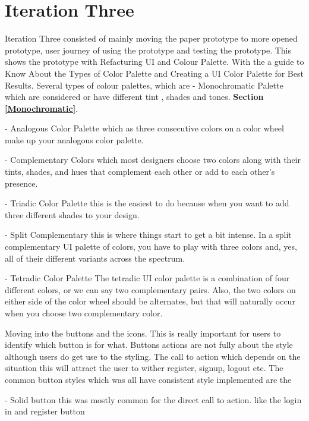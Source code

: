 \documentclass{l4proj}
\begin{document}
\section{Iteration Three}\label{requirementsIterationThree}


Iteration Three consisted of mainly moving the paper prototype to more opened prototype, user journey of using the prototype and testing the prototype. 
This shows the prototype with Refacturing UI and Colour Palette. With the a guide to Know About the Types of Color Palette and Creating a UI Color Palette for Best Results. Several types of colour palettes, which are 
- Monochromatic Palette which are considered or have different tint , shades and tones. \textbf{Section \ref{Monochromatic}}.



- Analogous Color Palette which as three consecutive colors on a color wheel make up your analogous color palette. 


- Complementary Colors which most designers choose two colors along with their tints, shades, and hues that complement each other or add to each other's presence.



- Triadic Color Palette this is the easiest to do because when you want to add three different shades to your design.


- Split Complementary this is where things start to get a bit intense. In a split complementary UI palette of colors, you have to play with three colors and, yes, all of their different variants across the spectrum.



- Tetradic Color Palette The tetradic UI color palette is a combination of four different colors, or we can say two complementary pairs. Also, the two colors on either side of the color wheel should be alternates, but that will naturally occur when you choose two complementary color. 


Moving into the buttons and the icons. This is really important for users to identify which button is for what. Buttons actions are not fully about the style although users do get use to the styling. The call to action which depends on the situation this will attract the user to wither register, signup, logout etc. The common button styles which was all have consistent style  implemented are the 

- Solid button this was mostly common for the direct call to action. like the login in and register button 
\end{document}
